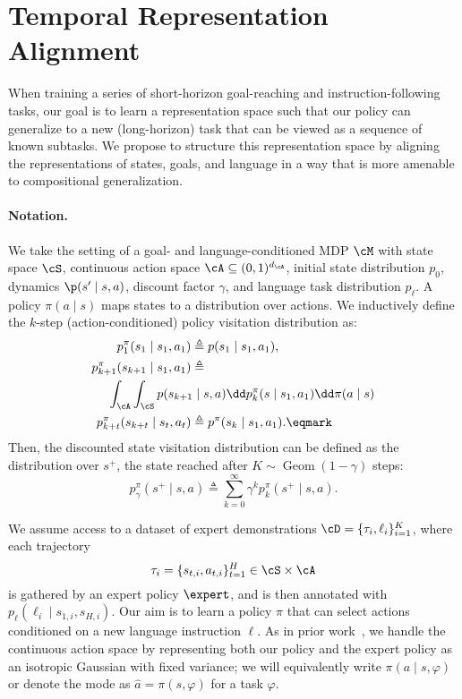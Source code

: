 \section{Temporal Representation Alignment}
\label{sec:approach}

When training a series of short-horizon goal-reaching and instruction-following tasks, our goal is to learn a representation space such that our policy can generalize to a new (long-horizon) task that can be viewed as a sequence of known subtasks.
We propose to structure this representation space by aligning the representations of states, goals, and language in a way that is more amenable to compositional generalization.

\paragraph{Notation.}
We take the setting of a goal- and language-conditioned MDP $\cM$ with state space $\cS$, continuous action space $\cA \subseteq (0,1)^{d_{\cA}}$, initial state distribution $p_0$, dynamics $\p(s'\mid s,a)$, discount factor $\gamma$, and language task distribution $p_{\ell}$.
A policy $\pi(a\mid s)$ maps states to a distribution over actions. We inductively define the $k$-step (action-conditioned) policy visitation distribution as:
\begin{align*}
    p^{\pi}_{1}(s_{1} \mid s_1, a_{1})
    &\triangleq p(s_1 \mid s_1, a_1),\\
    p^{\pi}_{k+1}(s_{k+1} \mid s_1, a_1)
    &\triangleq \nonumber\\*
      &\mspace{-120mu} \int_{\cA}\int_{\cS} p(s_{k+1} \mid s,a) \dd p^{\pi}_{k}(s \mid s_{1},a_1) \dd
        \pi(a \mid s)\\
    p^{\pi}_{k+t}(s_{k+t} \mid s_t,a_t)
    &\triangleq p^{\pi}(s_{k} \mid s_1, a_1) . \eqmark
        \label{eq:successor_distribution}
\end{align*}
Then, the discounted state visitation distribution can be defined as the distribution over $s^{+}$\llap, the state reached after $K\sim \operatorname{Geom}(1-\gamma)$ steps:
\begin{equation}
    p^{\pi}_{\gamma}(s^{+}  \mid  s,a) \triangleq \sum_{k=0}^{\infty} \gamma^{k} p^{\pi}_{k}(s^{+} \mid s,a).
    \label{eq:discounted_state_visitation}
\end{equation}

We assume access to a dataset of expert demonstrations $\cD = \{\tau_{i},\ell_i\}_{i=1}^{K}$, where each trajectory
\begin{equation}
    \tau_{i} = \{s_{t,i},a_{t,i}\}_{t=1}^{H} \in \cS \times \cA
    \label{eq:trajectory}
\end{equation}
is gathered by an expert policy $\expert$, and is then annotated with $p_{\ell}(\ell_{i} \mid s_{1,i}, s_{H,i})$.
Our aim is to learn a policy $\pi$ that can select actions conditioned on a new language instruction $\ell$.
As in prior work~\citep{walke2023bridgedata}, we handle the continuous action space by representing both our policy and the expert policy as an isotropic Gaussian with fixed variance; we will equivalently write $\pi(a\mid s, \varphi)$ or denote the mode as $\hat{a} = \pi(s,\varphi)$ for a task $\varphi$.

